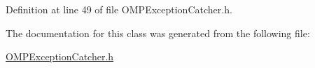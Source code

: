 Definition at line 49 of file O\+M\+P\+Exception\+Catcher.\+h.



The documentation for this class was generated from the following file\+:\begin{DoxyCompactItemize}
\item 
\hyperlink{OMPExceptionCatcher_8h}{O\+M\+P\+Exception\+Catcher.\+h}\end{DoxyCompactItemize}
